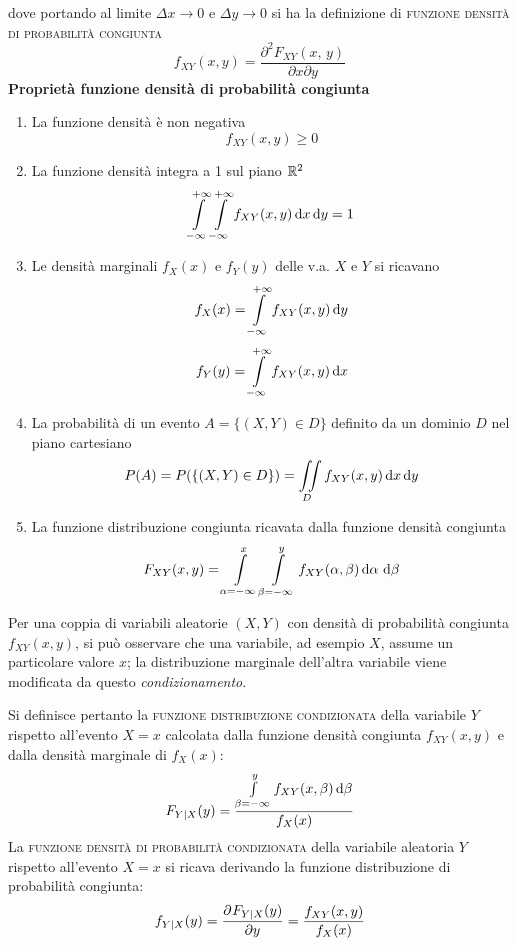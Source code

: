 dove portando al limite $\Delta x\to 0$ e $\Delta y\to 0$ si ha la definizione di \textsc{funzione densità di probabilità congiunta}
\begin{equation}
f_{XY}(x,y)=\frac{\partial^2 F_{XY}(x,\,y)}{\partial x\partial y}
\end{equation}
\textbf{Proprietà funzione densità di probabilità congiunta}
\begin{enumerate}
\item La funzione densità è non negativa
\begin{equation}f_{XY}(x,y)\geq 0\end{equation}
\item La funzione densità integra a 1 sul piano $\mathbb{R}^2$
\begin{equation}\int\limits_{-\infty}^{+\infty}{\int\limits_{-\infty}^{+\infty}{f_{XY}(x,y)}{\,\mathop{}\!\mathrm{d}{x}}}{\,\mathop{}\!\mathrm{d}{y}}=1\end{equation}
\item Le densità marginali $f_X(x)$ e $f_Y(y)$ delle v.a. $X$ e $Y$ si ricavano
\begin{equation}
f_X(x)=\int\limits_{-\infty}^{+\infty}{f_{XY}(x,y)}{\,\mathop{}\!\mathrm{d}{y}}
\end{equation}
\begin{equation}
f_Y(y)=\int\limits_{-\infty}^{+\infty}{f_{XY}(x,y)}{\,\mathop{}\!\mathrm{d}{x}}
\end{equation}
\item La probabilità di un evento $A=\{(X,Y)\in D\}$ definito da un dominio $D$ nel piano cartesiano
\begin{equation}\label{eq:funz_dens_prob_cong_dominio}
P(A)=P(\{(X,Y)\in D\})=\iint\limits_{D}{f_{XY}(x,y)\mathop{}\!\mathrm{d} x \mathop{}\!\mathrm{d} y}\end{equation}
\item La funzione distribuzione congiunta ricavata dalla funzione densità congiunta
\begin{equation}
F_{XY}(x,y)=\int\limits_{\alpha=-\infty}^{x}\int\limits_{\beta=-\infty}^{y}{f_{XY}(\alpha,\beta)}{\,\mathop{}\!\mathrm{d} \alpha\,\mathop{}\!\mathrm{d} \beta}\end{equation}
\end{enumerate}

Per una coppia di variabili aleatorie $(X,Y)$ con densità di probabilità congiunta $f_{XY}(x,y)$, si può osservare che una variabile, ad esempio $X$, assume un particolare valore $x$; la distribuzione marginale dell'altra variabile viene modificata da questo \emph{condizionamento}.

Si definisce pertanto la \textsc{funzione distribuzione condizionata} della variabile $Y$ rispetto all'evento $X=x$ calcolata dalla funzione densità congiunta $f_{XY}(x,y)$ e dalla densità marginale di $f_X(x)$:
\begin{equation}
F_{Y|X}(y)=\frac{\int\limits_{\beta=-\infty}^{y}{f_{XY}(x,\beta)}{\,\mathop{}\!\mathrm{d}{\beta}}}{f_X(x)}
\end{equation}
La \textsc{funzione densità di probabilità condizionata} della variabile aleatoria $Y$ rispetto all'evento $X=x$ si ricava derivando la funzione distribuzione di probabilità congiunta:
\begin{equation}
f_{Y|X}(y)=\frac{\partial^{}F_{Y|X}(y)}{\partial y^{}}=\frac{f_{XY}(x,y)}{f_X(x)}
\end{equation}

